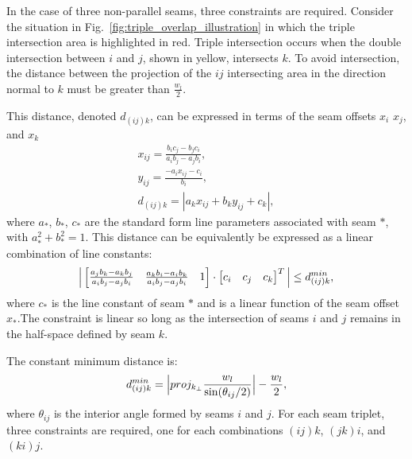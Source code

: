 In the case of three non-parallel seams, three constraints are required. Consider the situation in Fig.~\ref{fig:triple_overlap_illustration} in which the triple intersection area is highlighted in red. Triple intersection occurs when the double intersection between $i$ and $j$, shown in yellow, intersects $k$. To avoid intersection, the distance between the projection of the $ij$ intersecting area in the direction normal to $k$ must be greater than $\frac{w_l}{2}$.

This distance, denoted $d_{(ij)k}$, can be expressed in terms of the seam offsets $x_i$ $x_j$, and $x_k$
\begin{equation}
    \label{eq:lap_stacking_non_parallel}
    \begin{split}
        x_{ij} = \frac{b_i c_j - b_j c_i}{a_i b_j - a_j b_i}, \\
        y_{ij} = \frac{-a_i x_{ij} - c_i}{b_i}, \\
        d_{(ij)k} = |a_k x_{ij} + b_k y_{ij} + c_k|,
    \end{split}
\end{equation}
where $a_*$, $b_*$, $c_*$ are the standard form line parameters associated with seam $*$, with $a_*^2 + b_*^2 = 1$. This distance can be equivalently be expressed as a linear combination of line constants:
\begin{equation}
    \Big{|} \begin{bmatrix}
    \frac{a_j b_k - a_k b_j}{a_i b_j-a_j b_i} & \frac{a_k b_i - a_i b_k}{a_i b_j-a_j b_i} & 1 \\
    \end{bmatrix} 
    \cdot 
    \begin{bmatrix}
    c_i & c_j & c_k
    \end{bmatrix}^T
    \Big{|} 
    \leq d_{(ij)k}^{min},
\end{equation}
where $c_*$ is the line constant of seam $*$ and is a linear function of the seam offset $x_*$.The constraint is linear so long as  the intersection of seams $i$ and $j$ remains in the half-space defined by seam $k$.

The constant minimum distance is:
\begin{equation}
    d_{(ij)k}^{min} = \Big{|}proj_{k_{\perp}} \frac{w_l}{\sin(\theta_{ij}/2)}\Big{|} - \frac{w_l}{2},
\end{equation}
where $\theta_{ij}$ is the interior angle formed by seams $i$ and $j$. For each seam triplet, three constraints are required, one for each combinations $(ij)k$, $(jk)i$, and $(ki)j$.

